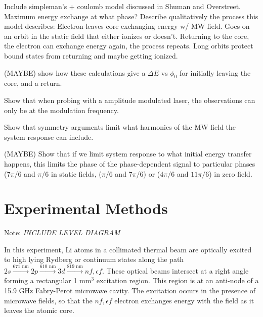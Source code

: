 \documentclass[aps,pra,preprint,groupedaddress]{revtex4-1}
\begin{document}
Include simpleman's + coulomb model discussed in Shuman and Overstreet. Maximum energy exchange at what phase? Describe qualitatively the process this model describes: Electron leaves core exchanging energy w/ MW field. Goes on an orbit in the static field that either ionizes or doesn't. Returning to the core, the electron can exchange energy again, the process repeats. Long orbits protect bound states from returning and maybe getting ionized.

(MAYBE) show how these calculations give a $\Delta E$ vs $\phi_0$ for initially leaving the core, and a return.

Show that when probing with a amplitude modulated laser, the observations can only be at the modulation frequency.

Show that symmetry arguments limit what harmonics of the MW field the system response can include.

(MAYBE) Show that if we limit system response to what initial energy transfer happens, this limits the phase of the phase-dependent signal to particular phases ($7\pi/6$ and $\pi/6$ in static fields, ($\pi/6$ and $7\pi/6$) or ($4\pi/6$ and $11\pi/6$) in zero field.

\section{\label{sec:exp} Experimental Methods}

Note: \emph{INCLUDE LEVEL DIAGRAM}

In this experiment, Li atoms in a collimated thermal beam are optically excited to high lying Rydberg or continuum states along the path $2s \xrightarrow{\text{671 nm}} 2p \xrightarrow{\text{610 nm}} 3d \xrightarrow{\text{819 nm}} nf, \epsilon f$. These optical beams intersect at a right angle forming a rectangular 1 mm$^3$ excitation region. This region is at an anti-node of a 15.9 GHz Fabry-Perot microwave cavity. The excitation occurs in the presence of microwave fields, so that the $nf, \epsilon f$ electron exchanges energy with the field as it leaves the atomic core.

\end{document}
